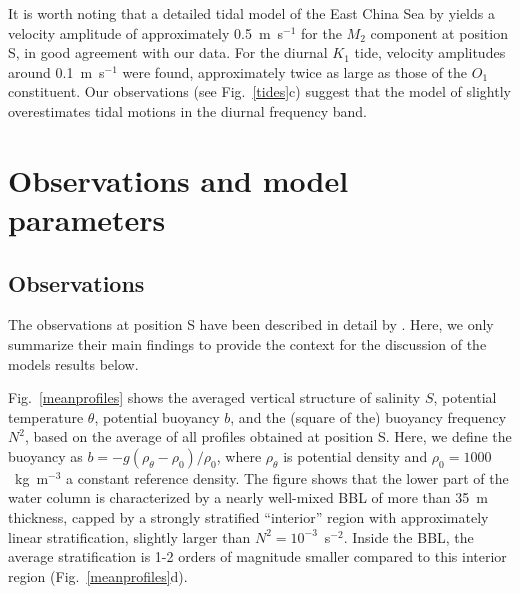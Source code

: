 It is worth noting that a detailed tidal model of the East China Sea
by \cite{Baoetal2000} yields a velocity amplitude of approximately
0.5~m~s$^{-1}$ for the $M_2$ component at position S, in good
agreement with our data. For the diurnal $K_1$ tide, velocity amplitudes around
0.1~m~s$^{-1}$ were found, approximately twice as large as those of the
$O_1$ constituent. Our observations (see Fig.\ \ref{tides}c) suggest
that the model of \cite{Baoetal2000} slightly overestimates tidal
motions in the diurnal frequency band.

\section{Observations and model parameters}\label{observations}

\subsection{Observations}

The observations at position S have been described in detail by
\cite{Endohetal2016a}. Here, we only summarize their main findings to
provide the context for the discussion of the models results below.

Fig.\ \ref{meanprofiles} shows the averaged vertical structure of
salinity $S$, potential temperature $\theta$, potential buoyancy $b$,
and the (square of the) buoyancy frequency $N^2$, based on the average
of all profiles obtained at position S. Here, we define the buoyancy
as $b = - g (\rho_\theta-\rho_0)/\rho_0$, where $\rho_\theta$ is
potential density and $\rho_0=1000$~kg~m$^{-3}$ a constant reference
density. The figure shows that the lower part of the water column is
characterized by a nearly well-mixed BBL of more than 35~m thickness,
capped by a strongly stratified ``interior'' region with approximately
linear stratification, slightly larger than $N^2=10^{-3}$~s$^{-2}$.
Inside the BBL, the average stratification is 1-2 orders of magnitude
smaller compared to this interior region (Fig.\ \ref{meanprofiles}d).

